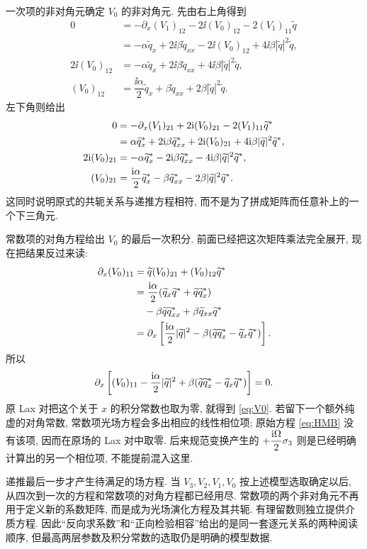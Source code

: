 \par\smallskip\noindent 一次项的非对角元确定 $V_0$ 的非对角元.\quad
先由右上角得到
\begin{align*}
0&=-\partial_x(V_1)_{12}
-2\ii(V_0)_{12}-2(V_1)_{11}\widetilde q\\
&=-\alpha\widetilde q_x+2\ii\beta\widetilde q_{xx}
-2\ii(V_0)_{12}+4\ii\beta|\widetilde q|^2\widetilde q,\\
2\ii(V_0)_{12}
&=-\alpha\widetilde q_x+2\ii\beta\widetilde q_{xx}
+4\ii\beta|\widetilde q|^2\widetilde q,\\
(V_0)_{12}
&=\dfrac{\ii\alpha}{2}\widetilde q_x
+\beta\widetilde q_{xx}+2\beta|\widetilde q|^2\widetilde q.
\end{align*}
左下角则给出
\begin{align*}
0&=-\partial_x(V_1)_{21}
+2\mathrm{i}(V_0)_{21}-2(V_1)_{11}{\widetilde q}^{*}\\
&=\alpha{\widetilde q_x}^{*}
+2\mathrm{i}\beta{\widetilde q_{xx}}^{*}
+2\mathrm{i}(V_0)_{21}
+4\mathrm{i}\beta|\widetilde q|^2{\widetilde q}^{*},\\
2\mathrm{i}(V_0)_{21}
&=-\alpha{\widetilde q_x}^{*}
-2\mathrm{i}\beta{\widetilde q_{xx}}^{*}
-4\mathrm{i}\beta|\widetilde q|^2{\widetilde q}^{*},\\
(V_0)_{21}
&=\dfrac{\mathrm{i}\alpha}{2}{\widetilde q_x}^{*}
-\beta{\widetilde q_{xx}}^{*}
-2\beta|\widetilde q|^2{\widetilde q}^{*}.
\end{align*}
这同时说明原式的共轭关系与递推方程相符, 而不是为了拼成矩阵而任意补上的一个下三角元.
\par\smallskip\noindent 常数项的对角方程给出 $V_0$ 的最后一次积分.\quad
前面已经把这次矩阵乘法完全展开, 现在把结果反过来读:
\begin{align*}
\partial_x(V_0)_{11}
&=\widetilde q(V_0)_{21}
+(V_0)_{12}{\widetilde q}^{*}\\
&=\dfrac{\mathrm{i}\alpha}{2}
(\widetilde q_x{\widetilde q}^{*}
+\widetilde q{\widetilde q_x}^{*})\\
&\quad-\beta\widetilde q{\widetilde q_{xx}}^{*}
+\beta\widetilde q_{xx}{\widetilde q}^{*}\\
&=\partial_x\left[
\dfrac{\mathrm{i}\alpha}{2}|\widetilde q|^2
-\beta(\widetilde q{\widetilde q_x}^{*}
-\widetilde q_x{\widetilde q}^{*})\right].
\end{align*}
所以
\begin{equation*}
\partial_x\left[
(V_0)_{11}-\dfrac{\mathrm{i}\alpha}{2}|\widetilde q|^2
+\beta(\widetilde q{\widetilde q_x}^{*}
-\widetilde q_x{\widetilde q}^{*})\right]=0.
\end{equation*}
原 Lax 对把这个关于 $x$ 的积分常数也取为零, 就得到 \eqref{eq:V0}. 若留下一个额外纯虚的对角常数, 常数项光场方程会多出相应的线性相位项; 原始方程 \eqref{eq:HMB} 没有该项, 因而在原场的 Lax 对中取零. 后来规范变换产生的 $+\dfrac{\mathrm{i}\Omega}{2}\sigma_3$ 则是已经明确计算出的另一个相位项, 不能提前混入这里.
\par\smallskip\noindent 递推最后一步才产生待满足的场方程.\quad
当 $V_3,V_2,V_1,V_0$ 按上述模型选取确定以后, 从四次到一次的方程和常数项的对角方程都已经用尽. 常数项的两个非对角元不再用于定义新的系数矩阵, 而是成为光场演化方程及其共轭. 有理留数则独立提供介质方程. 因此``反向求系数''和``正向检验相容''给出的是同一套逐元关系的两种阅读顺序, 但最高两层参数及积分常数的选取仍是明确的模型数据.

